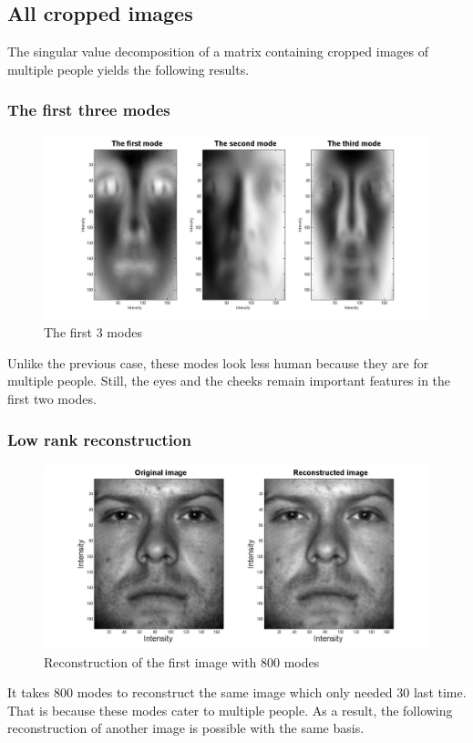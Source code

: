 \documentclass[a4paper]{article}
\begin{document}
\subsection{All cropped images}
The singular value decomposition of a matrix containing cropped images of multiple people yields the following results.


\subsubsection{The first three modes}
\begin{figure}[h!] 
	
	\includegraphics[width=1.\textwidth]{modesall.jpg}
	
	\caption{The first 3 modes}	
\end{figure}

Unlike the previous case, these modes look less human because they are for multiple people. Still, the eyes and the cheeks remain important features in the first two modes.

\subsubsection{Low rank reconstruction}
\begin{figure}[h!] 
	
	\includegraphics[width=1.\textwidth]{reconall1.jpg}
	
	\caption{Reconstruction of the first image with 800 modes}
	\end{figure}
It takes 800 modes to reconstruct the same image which only needed 30 last time. That is because these modes cater to multiple people. As a result, the following reconstruction of another image is possible with the same basis.
\end{document}
